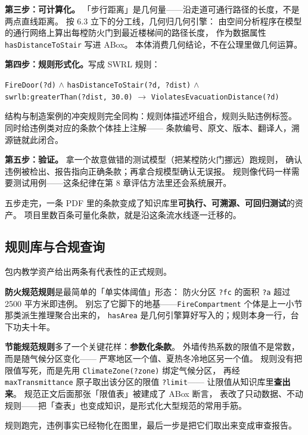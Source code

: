 \textbf{第三步：可计算化。}
「步行距离」是几何量——沿走道可通行路径的长度，不是两点直线距离。
按 6.3 立下的分工线，几何归几何引擎：
由空间分析程序在模型的通行网络上算出每樘防火门到最近楼梯间的路径长度，
作为数据属性 \texttt{hasDistanceToStair} 写进 ABox。
本体消费几何结论，不在公理里做几何运算。

\textbf{第四步：规则形式化。}写成 SWRL 规则：
\begin{center}
\texttt{FireDoor(?d)} \(\land\) \texttt{hasDistanceToStair(?d, ?dist)} \(\land\)\\
\texttt{swrlb:greaterThan(?dist, 30.0)}
\(\rightarrow\) \texttt{ViolatesEvacuationDistance(?d)}
\end{center}
结构与制造案例的冲突规则完全同构：规则体描述坏组合，规则头贴违例标签。
同时给违例类对应的条款个体挂上注解——
条款编号、原文、版本、翻译人，溯源链就此闭合。

\textbf{第五步：验证。}
拿一个故意做错的测试模型（把某樘防火门挪远）跑规则，
确认违例被检出、报告指向正确条款；再拿合规模型确认无误报。
规则像代码一样需要测试用例——这条纪律在第 8 章评估方法里还会系统展开。

五步走完，一条 PDF 里的条款变成了知识库里\textbf{可执行、可溯源、可回归测试}的资产。
项目里数百条可量化条款，就是沿这条流水线逐一迁移的。

\subsection{规则库与合规查询}

包内教学资产给出两条有代表性的正式规则。



\textbf{防火规范规则}是最简单的「单实体阈值」形态：
防火分区 \texttt{?fc} 的面积 \texttt{?a} 超过 2500 平方米即违例。
别忘了它脚下的地基——\texttt{FireCompartment} 个体是上一小节那类派生推理聚合出来的，
\texttt{hasArea} 是几何引擎算好写入的；规则本身一行，台下功夫十年。

\textbf{节能规范规则}多了一个关键花样：\textbf{参数化条款}。
外墙传热系数的限值不是常数，而是随气候分区变化——
严寒地区一个值、夏热冬冷地区另一个值。
规则没有把限值写死，而是先用 \texttt{ClimateZone(?zone)} 绑定气候分区，
再经 \texttt{maxTransmittance} 原子取出该分区的限值 \texttt{?limit}——
让限值从知识库里\textbf{查出来}。
规范正文后面那张「限值表」被建成了 ABox 断言，
表改了只动数据、不动规则——把「查表」也变成知识，是形式化大型规范的常用手筋。

规则跑完，违例事实已经物化在图里，最后一步是把它们取出来变成审查报告。

